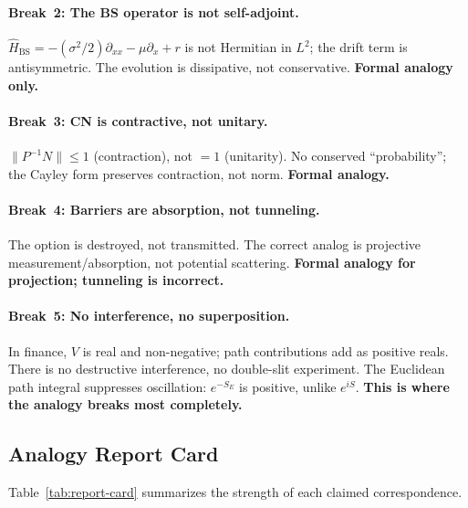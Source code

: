 \paragraph{Break~2: The BS operator is not self-adjoint.}
$\hat{H}_{\text{BS}} = -(\sigma^2/2)\partial_{xx} - \mu\partial_x + r$ is not Hermitian in $L^2$; the drift term is antisymmetric.  The evolution is dissipative, not conservative.  \textbf{Formal analogy only.}

\paragraph{Break~3: CN is contractive, not unitary.}
$\|P^{-1}N\| \le 1$ (contraction), not $= 1$ (unitarity).  No conserved ``probability''; the Cayley form preserves contraction, not norm.  \textbf{Formal analogy.}

\paragraph{Break~4: Barriers are absorption, not tunneling.}
The option is destroyed, not transmitted.  The correct analog is projective measurement/absorption, not potential scattering.  \textbf{Formal analogy for projection; tunneling is incorrect.}

\paragraph{Break~5: No interference, no superposition.}
In finance, $V$ is real and non-negative; path contributions add as positive reals.  There is no destructive interference, no double-slit experiment.  The Euclidean path integral suppresses oscillation: $e^{-S_E}$ is positive, unlike $e^{iS}$.  \textbf{This is where the analogy breaks most completely.}

\subsection{Analogy Report Card}

Table~\ref{tab:report-card} summarizes the strength of each claimed correspondence.

